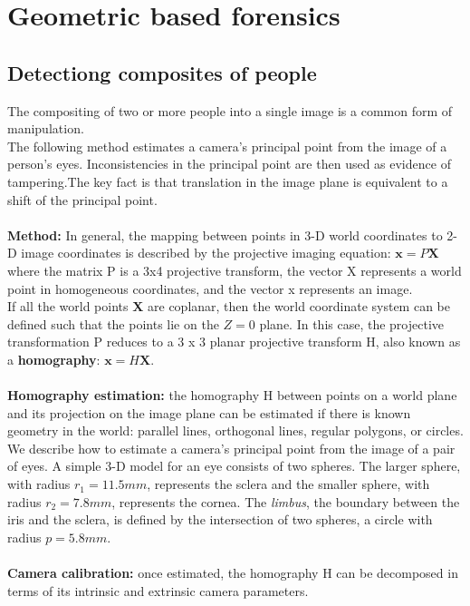 \documentclass[10pt,a4paper]{book}
\begin{document}
\section{Geometric based forensics}
\subsection{Detectiong composites of people}
The compositing of two or more people into a single image is a common form of manipulation.\\
The following method estimates a camera’s principal point from the image of a person’s eyes. Inconsistencies in the principal point are then used as evidence of tampering.The key fact is that translation in the image plane is equivalent to a shift of the principal point.\\\\
\textbf{Method:} In general, the mapping between points in 3-D world coordinates to 2-D image
coordinates is described by the projective imaging equation: $ \textbf{x}  = P \textbf{X}$ where the matrix P is a 3x4 projective transform, the vector X represents a world point in homogeneous coordinates, and the vector x represents an image.\\
If all the world points \textbf{X} are coplanar, then the world coordinate system can be defined such that the points lie on the $Z = 0$ plane. In this case, the projective transformation P reduces to a 3 x 3 planar
projective transform H, also known as a \textbf{homography}: $ \textbf{x}  = H \textbf{X}$.\\\\
\textbf{Homography estimation:} the homography H between points on a world plane and its projection on the
image plane can be estimated if there is known geometry in the world: parallel lines, orthogonal lines, regular polygons, or circles.\\
We describe how to estimate a camera’s principal point from the image of a pair of eyes.
A simple 3-D model for an eye consists of two spheres. The larger sphere,
with radius $r_1 = 11.5 mm$, represents the sclera and the smaller sphere, with radius $r_2 = 7.8 mm$, represents the cornea. The \emph{limbus}, the boundary between the
iris and the sclera, is defined by the intersection of two spheres, a circle with radius $p = 5.8 mm$.\\\\
\textbf{Camera calibration:} once estimated, the homography H can be decomposed in terms of its intrinsic
and extrinsic camera parameters.\\
\end{document}
